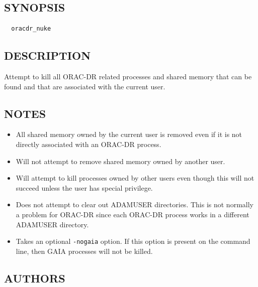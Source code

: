 \documentclass[twoside,11pt]{article}
\renewcommand{\_}{\texttt{\symbol{95}}}
\begin{document}
\subsection*{SYNOPSIS\label{oracdr_nuke_SYNOPSIS}}
\begin{verbatim}
  oracdr_nuke
\end{verbatim}
\subsection*{DESCRIPTION\label{oracdr_nuke_DESCRIPTION}}


Attempt to kill all ORAC-DR related processes and shared memory that
can be found and that are associated with the current user.

\subsection*{NOTES\label{oracdr_nuke_NOTES}}
\begin{itemize}

\item 

All shared memory owned by the current user is removed even if
it is not directly associated with an ORAC-DR process.


\item 

Will not attempt to remove shared memory owned by another user.


\item 

Will attempt to kill processes owned by other users even though
this will not succeed unless the user has special privilege.


\item 

Does not attempt to clear out ADAM\_USER directories. This is not
normally a problem for ORAC-DR since each ORAC-DR process works
in a different ADAM\_USER directory.


\item 

Takes an optional \texttt{-nogaia} option. If this option is present on the
command line, then GAIA processes will not be killed.

\end{itemize}
\subsection*{AUTHORS\label{oracdr_nuke_AUTHORS}}
\end{document}
